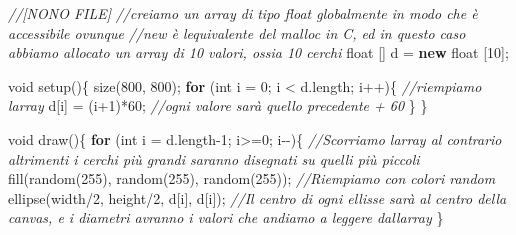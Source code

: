 \documentclass[
]{article}
\newenvironment{Shaded}{}{}
\newcommand{\CommentTok}[1]{\textcolor[rgb]{0.38,0.63,0.69}{\textit{#1}}}
\newcommand{\ControlFlowTok}[1]{\textcolor[rgb]{0.00,0.44,0.13}{\textbf{#1}}}
\newcommand{\DataTypeTok}[1]{\textcolor[rgb]{0.56,0.13,0.00}{#1}}
\newcommand{\DecValTok}[1]{\textcolor[rgb]{0.25,0.63,0.44}{#1}}
\newcommand{\FunctionTok}[1]{\textcolor[rgb]{0.02,0.16,0.49}{#1}}
\newcommand{\KeywordTok}[1]{\textcolor[rgb]{0.00,0.44,0.13}{\textbf{#1}}}
\newcommand{\NormalTok}[1]{#1}
\newcommand{\OperatorTok}[1]{\textcolor[rgb]{0.40,0.40,0.40}{#1}}
\begin{document}
\begin{Shaded}
\begin{Highlighting}[]
\CommentTok{//[NONO FILE]}
\CommentTok{//creiamo un array di tipo float globalmente in modo che è accessibile ovunque}
\CommentTok{//new è l\textquotesingle{}equivalente del malloc in C, ed in questo caso abbiamo allocato un array di 10 valori, ossia 10 cerchi}
\DataTypeTok{float} \OperatorTok{[]}\NormalTok{ d }\OperatorTok{=} \KeywordTok{new} \DataTypeTok{float} \OperatorTok{[}\DecValTok{10}\OperatorTok{];} 

\DataTypeTok{void} \FunctionTok{setup}\OperatorTok{()\{}
  \FunctionTok{size}\OperatorTok{(}\DecValTok{800}\OperatorTok{,} \DecValTok{800}\OperatorTok{);}
  \ControlFlowTok{for} \OperatorTok{(}\DataTypeTok{int}\NormalTok{ i }\OperatorTok{=} \DecValTok{0}\OperatorTok{;}\NormalTok{ i }\OperatorTok{\textless{}}\NormalTok{ d}\OperatorTok{.}\FunctionTok{length}\OperatorTok{;}\NormalTok{ i}\OperatorTok{++)\{} \CommentTok{//riempiamo l\textquotesingle{}array}
\NormalTok{    d}\OperatorTok{[}\NormalTok{i}\OperatorTok{]} \OperatorTok{=} \OperatorTok{(}\NormalTok{i}\OperatorTok{+}\DecValTok{1}\OperatorTok{)*}\DecValTok{60}\OperatorTok{;} \CommentTok{//ogni valore sarà quello precedente + 60}
  \OperatorTok{\}}
\OperatorTok{\}}

\DataTypeTok{void} \FunctionTok{draw}\OperatorTok{()\{}
  \ControlFlowTok{for} \OperatorTok{(}\DataTypeTok{int}\NormalTok{ i }\OperatorTok{=}\NormalTok{ d}\OperatorTok{.}\FunctionTok{length}\OperatorTok{{-}}\DecValTok{1}\OperatorTok{;}\NormalTok{ i}\OperatorTok{\textgreater{}=}\DecValTok{0}\OperatorTok{;}\NormalTok{ i}\OperatorTok{{-}{-})\{} \CommentTok{//Scorriamo l\textquotesingle{}array al contrario altrimenti i cerchi più grandi saranno disegnati su quelli più piccoli }
    \FunctionTok{fill}\OperatorTok{(}\FunctionTok{random}\OperatorTok{(}\DecValTok{255}\OperatorTok{),} \FunctionTok{random}\OperatorTok{(}\DecValTok{255}\OperatorTok{),} \FunctionTok{random}\OperatorTok{(}\DecValTok{255}\OperatorTok{));} \CommentTok{//Riempiamo con colori random}
    \FunctionTok{ellipse}\OperatorTok{(}\NormalTok{width}\OperatorTok{/}\DecValTok{2}\OperatorTok{,}\NormalTok{ height}\OperatorTok{/}\DecValTok{2}\OperatorTok{,}\NormalTok{ d}\OperatorTok{[}\NormalTok{i}\OperatorTok{],}\NormalTok{ d}\OperatorTok{[}\NormalTok{i}\OperatorTok{]);} \CommentTok{//Il centro di ogni ellisse sarà al centro della canvas, e i diametri avranno i valori che andiamo a leggere dall\textquotesingle{}array}
  \OperatorTok{\}}


\end{Highlighting}
\end{Shaded}
\end{document}
